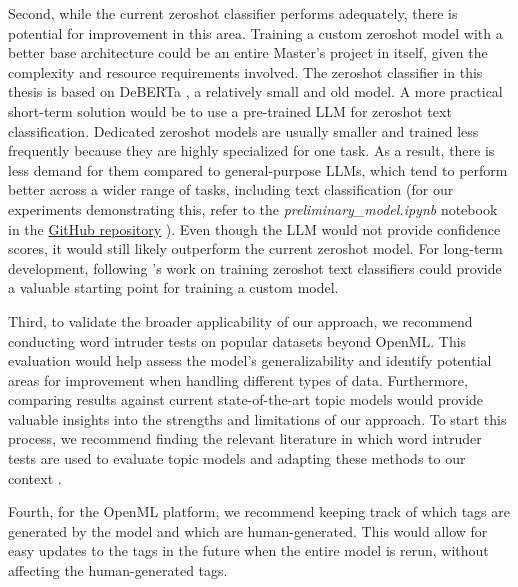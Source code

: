 Second, while the current zeroshot classifier performs adequately, there is potential for improvement in this area. Training a custom zeroshot model with a better base architecture could be an entire Master's project in itself, given the complexity and resource requirements involved. The zeroshot classifier in this thesis is based on DeBERTa \cite{he_deberta_2021}, a relatively small and old model. A more practical short-term solution would be to use a pre-trained LLM for zeroshot text classification. Dedicated zeroshot models are usually smaller and trained less frequently because they are highly specialized for one task. As a result, there is less demand for them compared to general-purpose LLMs, which tend to perform better across a wider range of tasks, including text classification (for our experiments demonstrating this, refer to the \textit{preliminary\_model.ipynb} notebook in the \href{https://github.com/ivangermanov/openml-tags}{GitHub repository} \cite{germanov_topic_modeling_of_2024} ). Even though the LLM would not provide confidence scores, it would still likely outperform the current zeroshot model. For long-term development, following \citet{laurer_building_2024}'s work on training zeroshot text classifiers could provide a valuable starting point for training a custom model.

Third, to validate the broader applicability of our approach, we recommend conducting word intruder tests on popular datasets beyond OpenML. This evaluation would help assess the model's generalizability and identify potential areas for improvement when handling different types of data. Furthermore, comparing results against current state-of-the-art topic models would provide valuable insights into the strengths and limitations of our approach. To start this process, we recommend finding the relevant literature in which word intruder tests are used to evaluate topic models and adapting these methods to our context \cite{chang_reading_2009,lau_machine_2014,hoyle_is_2021,newman_evaluating_2010,mimno_optimizing_nodate,musil_exploring_2024,bhatia_automatic_2017,lim_large-scale_2023}.

Fourth, for the OpenML platform, we recommend keeping track of which tags are generated by the model and which are human-generated. This would allow for easy updates to the tags in the future when the entire model is rerun, without affecting the human-generated tags.

